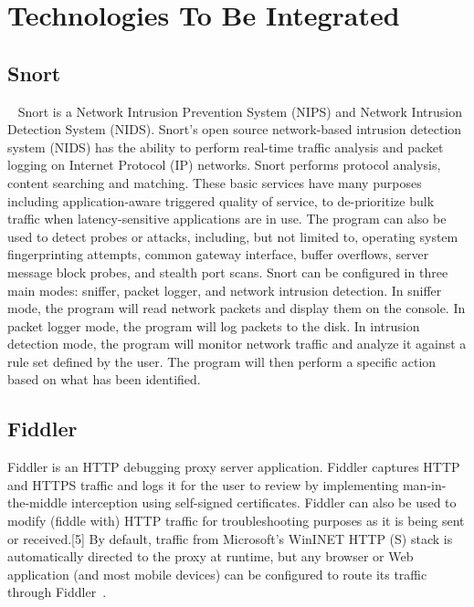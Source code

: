      \pv


\section{Technologies To Be Integrated}
\label{S:o-todo}

\subsection{Snort \cv}
~\cite{www-snort} Snort is a Network Intrusion Prevention System
(NIPS) and Network Intrusion Detection System (NIDS). Snort's open
source network-based intrusion detection system (NIDS) has the ability
to perform real-time traffic analysis and packet logging on Internet
Protocol (IP) networks. Snort performs protocol analysis, content
searching and matching. These basic services have many purposes
including application-aware triggered quality of service, to
de-prioritize bulk traffic when latency-sensitive applications are in
use.  The program can also be used to detect probes or attacks,
including, but not limited to, operating system fingerprinting
attempts, common gateway interface, buffer overflows, server message
block probes, and stealth port scans.  Snort can be configured in
three main modes: sniffer, packet logger, and network intrusion
detection. In sniffer mode, the program will read network packets and
display them on the console. In packet logger mode, the program will
log packets to the disk. In intrusion detection mode, the program will
monitor network traffic and analyze it against a rule set defined by
the user. The program will then perform a specific action based on
what has been identified.

\subsection{Fiddler}

Fiddler is an HTTP debugging proxy server application. Fiddler
captures HTTP and HTTPS traffic and logs it for the user to review by
implementing man-in-the-middle interception using self-signed
certificates. Fiddler can also be used to modify (fiddle with) HTTP
traffic for troubleshooting purposes as it is being sent or
received.[5] By default, traffic from Microsoft's WinINET HTTP (S)
stack is automatically directed to the proxy at runtime, but any
browser or Web application (and most mobile devices) can be configured
to route its traffic through Fiddler~\cite{www-fiddler}.

